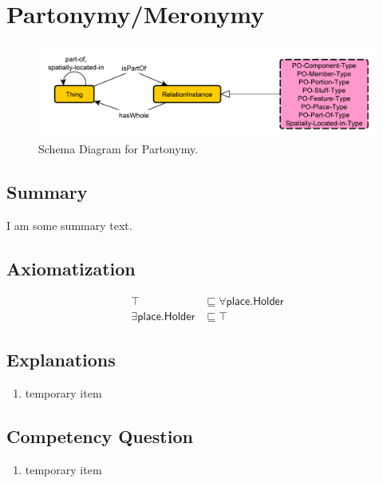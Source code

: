\section{Partonymy/Meronymy}
\label{sec:Partonymy}
\begin{figure}[h!]
\begin{center}
\includegraphics[width=.7\textwidth]{figures/partonymy}
\end{center}
\caption{Schema Diagram for Partonymy.}
\label{fig:Partonymy}
\end{figure}
\subsection{Summary}
\label{sum:Partonymy}
I am some summary text.

\subsection{Axiomatization}
\label{axs:Partonymy}
\begin{align}
\top &\sqsubseteq \forall\textsf{place.Holder} \\ 
\exists\textsf{place.Holder} &\sqsubseteq \top 
\end{align}

\subsection{Explanations}
\label{exp:Partonymy}
\begin{enumerate}
\item temporary item
\end{enumerate}

\subsection{Competency Question}
\label{cqs:Partonymy}
\begin{enumerate}[CQ1.]
\item temporary item
\end{enumerate}

\newpage
